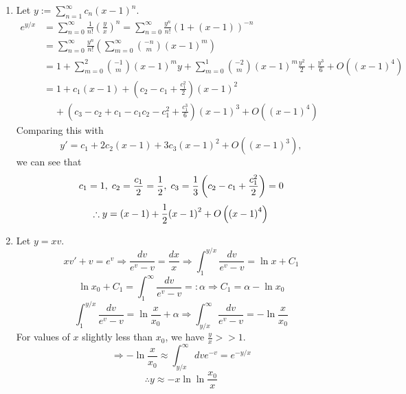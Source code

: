 \item
\begin{enumerate}[wide, labelindent=0pt, label= (\alph*)]
\item
Let $y := \sum_{n=1}^\infty c_n {(x - 1)}^n$.
\begin{align*}
	e^{y/x}
	&= \sum_{n=0}^\infty \frac{1}{n!} {\left( \frac{y}{x} \right)}^n
	 = \sum_{n=0}^\infty\frac{y^n}{n!} {\left( 1 + \left( x - 1 \right) \right)}^{-n} \\
	&= \sum_{n=0}^\infty\frac{y^n}{n!} \left( \sum_{m=0}^\infty \binom{-n}{m} {(x - 1)}^m \right) \\
	&= 1 + \sum_{m=0}^2 \binom{-1}{m} {(x - 1)}^m y
	     + \sum_{m=0}^1 \binom{-2}{m} {(x - 1)}^m \frac{y^2}{2}
		 + \frac{y^3}{6}
		 + O \left( {(x - 1)}^4 \right) \\
	&= 1 + c_1 (x - 1)
	     + \left( c_2 - c_1 + \frac{c_1^2}{2} \right) {(x - 1)}^2 \\
&\;\;\;\;+ \left( c_3 - c_2 + c_1 - c_1 c_2 - c_1^2 + \frac{c_1^3}{6} \right) {(x - 1)}^3
		 + O \left( {(x - 1)}^4 \right)
\end{align*}
Comparing this with
\[
	y' = c_1 + 2c_2 (x - 1) + 3c_3 {(x - 1)}^2 + O \left( {(x - 1)}^3 \right),
\]
we can see that
\[
	c_1 = 1,\;
	c_2 = \frac{c_1}{2} = \frac{1}{2},\;
	c_3 = \frac{1}{3} \left( c_2 - c_1 + \frac{c_1^2}{2} \right) = 0
\]
\[
	\therefore y = (x - 1) + \frac{1}{2} {(x - 1)}^2 + O \left( {(x - 1)}^4 \right)
\]

\item
Let $y = xv$.
\[
	xv' + v = e^v
	\Rightarrow \frac{dv}{e^v - v} = \frac{dx}{x}
	\Rightarrow \int_1^{y/x} \frac{dv}{e^v - v} = \ln x + C_1
\]
\[
	\ln x_0 + C_1 = \int_1^\infty \frac{dv}{e^v - v} =: \alpha
	\Rightarrow C_1 = \alpha - \ln x_0
\]
\[
	\int_1^{y/x} \frac{dv}{e^v - v} = \ln \frac{x}{x_0} + \alpha
	\Rightarrow \int_{y/x}^\infty \frac{dv}{e^v - v} = -\ln \frac{x}{x_0}
\]
For values of $x$ slightly less than $x_0$, we have $\frac{y}{x} >> 1$.
\[
	\Rightarrow -\ln \frac{x}{x_0} \approx \int_{y/x}^\infty dv e^{-v} = e^{-y/x}
\]
\[
	\therefore y \approx -x \ln \ln \frac{x_0}{x}
\]

\end{enumerate}